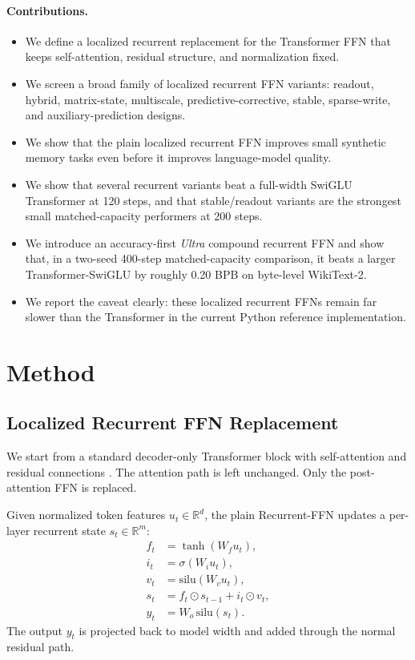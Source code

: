 \documentclass[11pt]{article}
\begin{document}
\paragraph{Contributions.}
\begin{itemize}[leftmargin=1.25em]
  \item We define a localized recurrent replacement for the Transformer FFN
  that keeps self-attention, residual structure, and normalization fixed.
  \item We screen a broad family of localized recurrent FFN variants: readout,
  hybrid, matrix-state, multiscale, predictive-corrective, stable,
  sparse-write, and auxiliary-prediction designs.
  \item We show that the plain localized recurrent FFN improves small
  synthetic memory tasks even before it improves language-model quality.
  \item We show that several recurrent variants beat a full-width SwiGLU
  Transformer at 120 steps, and that stable/readout variants are the strongest
  small matched-capacity performers at 200 steps.
  \item We introduce an accuracy-first \emph{Ultra} compound recurrent FFN and
  show that, in a two-seed 400-step matched-capacity comparison, it beats a
  larger Transformer-SwiGLU by roughly 0.20 BPB on byte-level WikiText-2.
  \item We report the caveat clearly: these localized recurrent FFNs remain far
  slower than the Transformer in the current Python reference implementation.
\end{itemize}

\section{Method}
\subsection{Localized Recurrent FFN Replacement}
We start from a standard decoder-only Transformer block with self-attention and
residual connections \citep{vaswani2017attention}. The attention path is left
unchanged. Only the post-attention FFN is replaced.

Given normalized token features $u_t \in \mathbb{R}^{d}$, the plain
Recurrent-FFN updates a per-layer recurrent state $s_t \in \mathbb{R}^{m}$:
\begin{align}
f_t &= \tanh(W_f u_t), \\
i_t &= \sigma(W_i u_t), \\
v_t &= \mathrm{silu}(W_v u_t), \\
s_t &= f_t \odot s_{t-1} + i_t \odot v_t, \\
y_t &= W_o \, \mathrm{silu}(s_t).
\end{align}
The output $y_t$ is projected back to model width and added through the normal
residual path.
\end{document}
